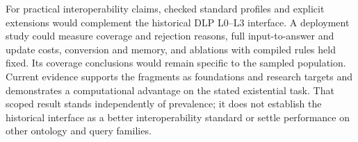 For practical interoperability claims, checked standard profiles and explicit
extensions would complement the historical DLP L0--L3 interface. A deployment study
could measure coverage and rejection reasons, full input-to-answer and update
costs, conversion and memory, and ablations with compiled rules held fixed.
Its coverage conclusions would remain specific to the sampled population.
Current evidence supports the fragments as foundations and research targets
and demonstrates a computational advantage on the stated existential task.
That scoped result stands independently of prevalence; it does not establish
the historical interface as a better interoperability standard or settle
performance on other ontology and query families.
